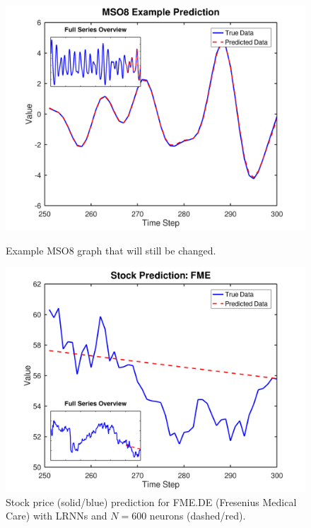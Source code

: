 \documentclass[twoside,11pt]{article}
\theoremstyle{definition}
\begin{document}
\begin{figure}
\begin{minipage}[t]{0.48\textwidth}
\includegraphics[width=\textwidth]{fig/mso8_prediction_1} %
  \caption{Example MSO8 graph that will still be changed.}
  \label{arima}
\end{minipage}
  \hfill%
\begin{minipage}[t]{0.48\textwidth}
 \includegraphics[width=\textwidth]{fig/stock_prediction_fme} %
  \caption{Stock price (solid/blue) prediction for FME.DE (Fresenius Medical Care) with LRNNs and $N=600$ neurons (dashed/red).}
  \label{LRNN}
\end{minipage}
\end{figure}
\end{document}
